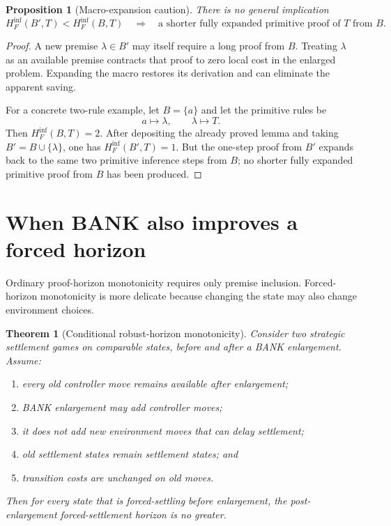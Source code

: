 \documentclass[11pt]{article}
\newtheorem{theorem}[definition]{Theorem}
\newtheorem{proposition}[definition]{Proposition}
\theoremstyle{remark}
\begin{document}
\begin{proposition}[Macro-expansion caution]
There is no general implication
\[
H_F^{\mathrm{inf}}(B',T)<H_F^{\mathrm{inf}}(B,T)
\quad\Longrightarrow\quad
\text{a shorter fully expanded primitive proof of }T\text{ from }B.
\]
\end{proposition}

\begin{proof}
A new premise $\lambda\in B'$ may itself require a long proof from $B$. Treating $\lambda$ as an available premise contracts that proof to zero local cost in the enlarged problem. Expanding the macro restores its derivation and can eliminate the apparent saving.

For a concrete two-rule example, let $B=\{a\}$ and let the primitive rules be
\[
a\longmapsto\lambda,
\qquad
\lambda\longmapsto T.
\]
Then $H_F^{\mathrm{inf}}(B,T)=2$.  After depositing the already proved lemma and taking
$B'=B\cup\{\lambda\}$, one has $H_F^{\mathrm{inf}}(B',T)=1$.  But the one-step proof from $B'$ expands back to the same two primitive inference steps from $B$; no shorter fully expanded primitive proof from $B$ has been produced.
\end{proof}

\section{When BANK also improves a forced horizon}

Ordinary proof-horizon monotonicity requires only premise inclusion. Forced-horizon monotonicity is more delicate because changing the state may also change environment choices.

\begin{theorem}[Conditional robust-horizon monotonicity]
Consider two strategic settlement games on comparable states, before and after a BANK enlargement. Assume:
\begin{enumerate}[label=(\roman*),leftmargin=2.2em]
\item every old controller move remains available after enlargement;
\item BANK enlargement may add controller moves;
\item it does not add new environment moves that can delay settlement;
\item old settlement states remain settlement states; and
\item transition costs are unchanged on old moves.
\end{enumerate}
Then for every state that is forced-settling before enlargement, the post-enlargement forced-settlement horizon is no greater.
\end{theorem}
\end{document}
